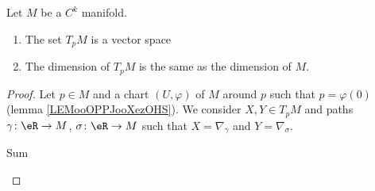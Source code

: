 \begin{proposition}  \label{PROPooEJBWooSbvypo}
    Let \( M\) be a \( C^k\) manifold.
    \begin{enumerate}
        \item
            The set \( T_pM\) is  a vector space
        \item
            The dimension of \( T_pM\) is the same as the dimension of \( M\).
    \end{enumerate}
\end{proposition}

\begin{proof}
    Let \( p\in M\) and a chart \( (U,\varphi)\) of \( M\) around \( p\) such that \( p=\varphi(0)\) (lemma \ref{LEMooOPPJooXezOHS}). We consider \( X,Y\in T_pM\) and paths \( \gamma\colon \eR\to M\), \( \sigma\colon \eR\to M\) such that \( X=\nabla_{\gamma}\) and \( Y=\nabla_{\sigma}\).

    \begin{subproof}
    \item[Sum]
        


\end{subproof}
\end{proof}
